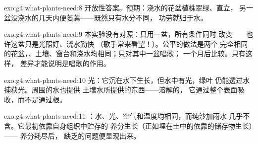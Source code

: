 \begin{solution}{exo:g4:what-plants-need:8}
开放性答案。预期：浇水的花盆植株翠绿、直立，
另一盆没浇水的几天内便萎蔫——既然只有水分不同，
功劳就归于水。
\end{solution}

\begin{solution}{exo:g4:what-plants-need:9}
本实验没有对照：只用一盆，所有条件同时
改变——也许这盆只是光照好、浇水勤快
（歌手常来看望！）。公平的做法是两个
完全相同的花盆，、土壤、窗台和浇水均相同；只对其中一盆唱歌；
一个月后比较。只有这样，
差异才能说明是唱歌的作用。
\end{solution}

\begin{solution}{exo:g4:what-plants-need:10}
光：它沉在水下生长，但水中有光，绿叶
仍能透过水捕获光。周围的水也提供
土壤水所提供的东西——溶解的，
它通过整个表面吸收，而不是通过根。
\end{solution}

\begin{solution}{exo:g4:what-plants-need:11}
：水、光、空气和温度均相同，而纯沙加雨水
几乎不含。它最初依靠自身组织中贮存的
养分生长（正如埋在土中的依靠的储存物生长）——
养分耗尽后，
缺乏的问题便显现出来。
\end{solution}
